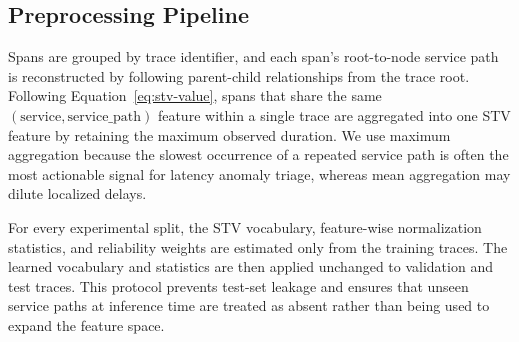 \documentclass[informatics,article,submit,moreauthors]{Definitions/mdpi}
\begin{document}
\subsection{Preprocessing Pipeline}

Spans are grouped by trace identifier, and each span's root-to-node
service path is reconstructed by following parent-child relationships
from the trace root. Following Equation~\ref{eq:stv-value}, spans that
share the same \((\text{service}, \text{service\_path})\) feature within
a single trace are aggregated into one STV feature by retaining the
maximum observed duration. We use maximum aggregation because the slowest
occurrence of a repeated service path is often the most actionable signal
for latency anomaly triage, whereas mean aggregation may dilute localized
delays.

For every experimental split, the STV vocabulary, feature-wise
normalization statistics, and reliability weights are estimated only from
the training traces. The learned vocabulary and statistics are then
applied unchanged to validation and test traces. This protocol prevents
test-set leakage and ensures that unseen service paths at inference time
are treated as absent rather than being used to expand the feature space.
\end{document}
